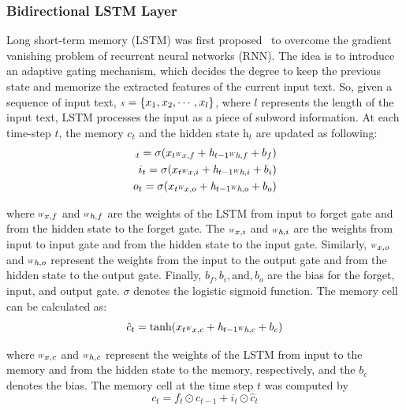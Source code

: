 \documentclass[conference]{IEEEtran}
\newcommand*{\Scale}[2][4]{\scalebox{#1}{$#2$}}%
\begin{document}
\subsubsection{Bidirectional LSTM Layer}
Long short-term memory (LSTM) was first proposed~\cite{schuster1997bidirectional} to overcome the gradient vanishing problem of recurrent neural networks (RNN). The idea is to introduce an adaptive gating mechanism, which decides the degree to keep the previous state and memorize the extracted features of the current input text. So, given a sequence of input text, $\Scale[0.5]X=\{x_1,x_2,\cdots,x_l\}$, where $l$ represents the length of the input text, LSTM processes the input as a piece of subword information. At each time-step $t$, the memory $c_t$ and the hidden state $\textit{h}_t$ are updated as following:
\setlength{\arraycolsep}{0.5pt}
\begin{equation}\label{eqn1}
\begin{split}\Scale[0.2]
f_t=\sigma(x_{t}\Scale[0.5]W_{x,f}+\textit{h}_{t-1}\Scale[0.5]W_{\textit{h},f}+b_f)\\
i_t=\sigma(x_{t}\Scale[0.5]W_{x,i}+\textit{h}_{t-1}\Scale[0.5]W_{\textit{h},i}+b_i)\\
 o_t=\sigma(x_{t}\Scale[0.5]W_{x,o}+\textit{h}_{t-1}\Scale[0.5]W_{\textit{h},o}+b_o)
\end{split}
\end{equation}

where $\Scale[0.5]W_{x,f}$ and $\Scale[0.5]W_{\textit{h},f}$ are the weights of the LSTM from input to forget gate and from the hidden state to the forget gate. The $\Scale[0.5]W_{x,i}$ and $\Scale[0.5]W_{\textit{h},i}$ are the weights from input to input gate and from the hidden state to the input gate. Similarly, $\Scale[0.5]W_{x,o}$ and $\Scale[0.5]W_{\textit{h},o}$ represent the weights from the input to the output gate and from the hidden state to the output gate. Finally, $\textit{b}_f, \textit{b}_i,\text{and},\textit{b}_o$ are the bias for the forget, input, and output gate. $\sigma$ denotes the logistic sigmoid function. The memory cell can be calculated as:
\setlength{\arraycolsep}{1pt}
\begin{equation}\label{eqn2}
    \hat{c}_{t}= \tanh({x_{t}\Scale[0.5]W_{x,c}+\textit{h}_{t-1}\Scale[0.5]W_{\textit{h},c}+b_c})
\end{equation}

where $\Scale[0.5]W_{x,c}$ and $\Scale[0.5]W_{h,c}$ represent the weights of the LSTM from input to the memory and from the hidden state to the memory, respectively, and the $\textit{b}_{c}$ denotes the bias. The memory cell at the time step $t$ was computed by
\setlength{\arraycolsep}{1pt}
\begin{equation}\label{eqn3}
    c_{t}= f_{t} \odot c_{t-1}+i_{t}\odot\hat{c}_{t}
\end{equation}
\end{document}
